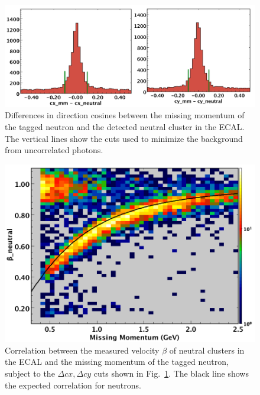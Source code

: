 \begin{figure}[h]
\centering
\includegraphics[width=1.0\columnwidth,keepaspectratio]{img/S10_4_1.png}
\caption[]{Differences in direction cosines between the missing momentum of the tagged neutron and the detected
  neutral cluster in the ECAL. The vertical lines show the cuts used to minimize the background from uncorrelated
  photons.}
\label{fig:S10_4_1}
\end{figure}

\begin{figure}[h]
\centering
\includegraphics[width=1.0\columnwidth,keepaspectratio]{img/S10_4_2.png}
\caption[]{Correlation between the measured velocity $\beta$ of neutral clusters in the ECAL and the missing
  momentum of the tagged neutron, subject to the $\Delta cx,\Delta cy$ cuts shown in Fig.~\ref{fig:S10_4_1}.
  The black line shows the expected correlation for neutrons.}
\label{fig:S10_4_2}
\end{figure}

